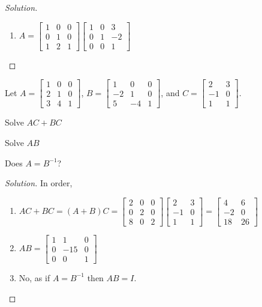 \documentclass[../main.tex]{subfiles}
\begin{document}
\begin{proof}[Solution]
\begin{enumerate}
\item $A = \begin{bmatrix} 1 & 0 & 0 \\ 0 & 1 & 0 \\ 1 & 2 & 1 \end{bmatrix} \begin{bmatrix} 1 & 0 & 3 \\ 0 & 1 & -2 \\ 0 & 0 & 1 \end{bmatrix}$
\end{enumerate}
\end{proof} 
%
\begin{problem}
Let $A = \begin{bmatrix} 1 & 0 & 0 \\ 2 & 1 & 0 \\ 3 & 4 & 1 \end{bmatrix}$, $B=\begin{bmatrix}1 & 0 & 0 \\ -2 & 1 & 0 \\ 5 & -4 & 1 \end{bmatrix}$, and $C = \begin{bmatrix} 2 & 3 \\ -1 & 0 \\ 1 & 1 \end{bmatrix}$. 
\begin{enumerate}
\begin{multicols}{3}
\item Solve $AC+BC$
\item Solve $AB$
\item Does $A = B^{-1}$?
\end{multicols}
\end{enumerate}
\end{problem}
\begin{proof}[Solution]
In order,
\begin{enumerate}
\item $AC+BC = (A+B)C = \begin{bmatrix} 2 & 0 & 0 \\ 0 & 2 & 0 \\ 8 & 0 & 2 \end{bmatrix} \begin{bmatrix} 2 & 3 \\ -1 & 0 \\ 1 & 1 \end{bmatrix} = \begin{bmatrix} 4 & 6 \\ -2 & 0 \\ 18 & 26 \end{bmatrix}$
\item $AB = \begin{bmatrix} 1 & 1 & 0 \\ 0 & -15 & 0 \\ 0 & 0 & 1 \end{bmatrix}$
\item No, as if $A=B^{-1}$ then $AB=I$.
\end{enumerate}
\end{proof}
\end{document}
